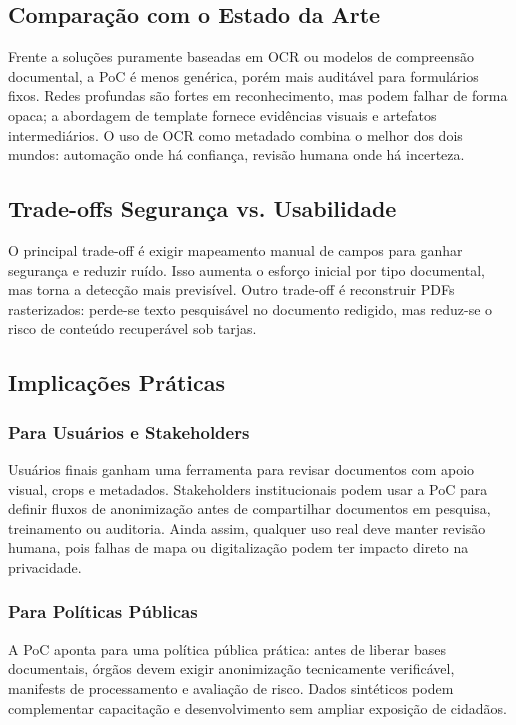 \documentclass[12pt,a4paper]{article}
\begin{document}
\subsection{Comparação com o Estado da Arte}

Frente a soluções puramente baseadas em OCR ou modelos de compreensão documental, a PoC é menos genérica, porém mais auditável para formulários fixos. Redes profundas são fortes em reconhecimento, mas podem falhar de forma opaca; a abordagem de template fornece evidências visuais e artefatos intermediários. O uso de OCR como metadado combina o melhor dos dois mundos: automação onde há confiança, revisão humana onde há incerteza.

\subsection{Trade-offs Segurança vs. Usabilidade}

O principal trade-off é exigir mapeamento manual de campos para ganhar segurança e reduzir ruído. Isso aumenta o esforço inicial por tipo documental, mas torna a detecção mais previsível. Outro trade-off é reconstruir PDFs rasterizados: perde-se texto pesquisável no documento redigido, mas reduz-se o risco de conteúdo recuperável sob tarjas.

\subsection{Implicações Práticas}

\subsubsection{Para Usuários e Stakeholders}
Usuários finais ganham uma ferramenta para revisar documentos com apoio visual, crops e metadados. Stakeholders institucionais podem usar a PoC para definir fluxos de anonimização antes de compartilhar documentos em pesquisa, treinamento ou auditoria. Ainda assim, qualquer uso real deve manter revisão humana, pois falhas de mapa ou digitalização podem ter impacto direto na privacidade.

\subsubsection{Para Políticas Públicas}
A PoC aponta para uma política pública prática: antes de liberar bases documentais, órgãos devem exigir anonimização tecnicamente verificável, manifests de processamento e avaliação de risco. Dados sintéticos podem complementar capacitação e desenvolvimento sem ampliar exposição de cidadãos.
\end{document}
